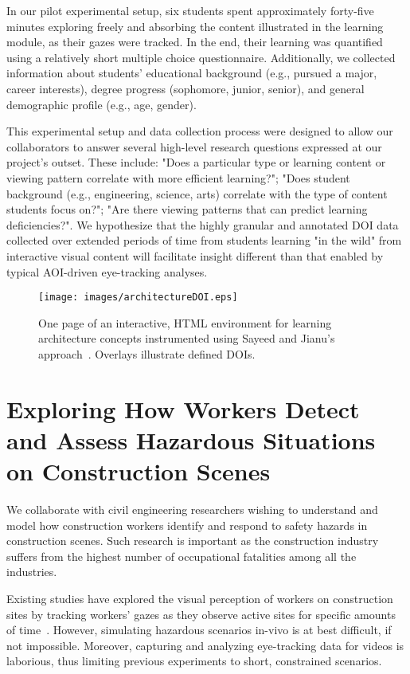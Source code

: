 In our pilot experimental setup, six students spent approximately forty-five minutes exploring freely and absorbing the content illustrated in the learning module, as their gazes were tracked. In the end, their learning was quantified using a relatively short multiple choice questionnaire. Additionally, we collected information about students' educational background (e.g., pursued a major, career interests), degree progress (sophomore, junior, senior), and general demographic profile (e.g., age, gender).

This experimental setup and data collection process were designed to allow our collaborators to answer several high-level research questions expressed at our project's outset. These include: "Does a particular type or learning content or viewing pattern correlate with more efficient learning?"; "Does student background (e.g., engineering, science, arts) correlate with the type of content students focus on?"; "Are there viewing patterns that can predict learning deficiencies?". We hypothesize that the highly granular and annotated DOI data collected over extended periods of time from students learning "in the wild" from interactive visual content will facilitate insight different than that enabled by typical AOI-driven eye-tracking analyses.

\begin{figure}[htbp]
  \centering
  \texttt{[image: images/architectureDOI.eps]}
  \caption{One page of an interactive, HTML environment for learning architecture concepts instrumented using Sayeed and Jianu's approach~\cite{Ala16}. Overlays illustrate defined DOIs.}
	\label{fig:archictecture}
\end{figure}

\section{Exploring How Workers Detect and Assess Hazardous Situations on Construction Scenes}
\label{sec:ExperimentConstruction}
We collaborate with civil engineering researchers wishing to understand and model how construction workers identify and respond to safety hazards in construction scenes. Such research is important as the construction industry  suffers from the highest  number of  occupational fatalities  among all  the industries. 

Existing studies have explored the visual perception of workers on construction sites by tracking workers' gazes as they observe active sites for specific amounts of time~\cite{SafetyPerf}. However, simulating hazardous scenarios in-vivo is at best difficult, if not impossible. 
Moreover, capturing and analyzing eye-tracking data for videos is laborious, thus limiting previous experiments to short, constrained scenarios. 


